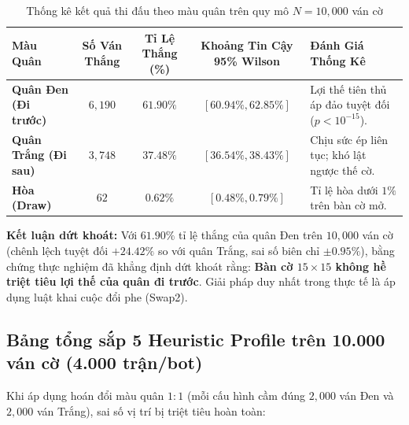 \documentclass[11pt,a4paper]{article}
\begin{document}
\begin{table}[htbp]
\centering
\small
\caption{Thống kê kết quả thi đấu theo màu quân trên quy mô $N = 10{,}000$ ván cờ}
\label{tab:color_stats_10k}
\begin{tabularx}{\textwidth}{l c c c X}
\toprule
\textbf{Màu Quân} & \textbf{Số Ván Thắng} & \textbf{Tỉ Lệ Thắng (\%)} & \textbf{Khoảng Tin Cậy 95\% Wilson} & \textbf{Đánh Giá Thống Kê} \\
\midrule
\textbf{Quân Đen (Đi trước)}  & \textbf{$6{,}190$} & \textbf{$61.90\%$} & $[60.94\%, 62.85\%]$ & Lợi thế tiên thủ áp đảo tuyệt đối ($p < 10^{-15}$). \\
\textbf{Quân Trắng (Đi sau)} & $3{,}748$ & $37.48\%$ & $[36.54\%, 38.43\%]$ & Chịu sức ép liên tục; khó lật ngược thế cờ. \\
\textbf{Hòa (Draw)}           & $62$   & $0.62\%$  & $[0.48\%, 0.79\%]$   & Tỉ lệ hòa dưới $1\%$ trên bàn cờ mở. \\
\bottomrule
\end{tabularx}
\end{table}

\textbf{Kết luận dứt khoát:} Với $61.90\%$ tỉ lệ thắng của quân Đen trên $10{,}000$ ván cờ (chênh lệch tuyệt đối \textbf{$+24.42\%$} so với quân Trắng, sai số biên chỉ $\pm 0.95\%$), bằng chứng thực nghiệm đã khẳng định dứt khoát rằng: \textbf{Bàn cờ $15 \times 15$ không hề triệt tiêu lợi thế của quân đi trước}. Giải pháp duy nhất trong thực tế là áp dụng luật khai cuộc đổi phe (Swap2).

\subsection{Bảng tổng sắp 5 Heuristic Profile trên 10.000 ván cờ (4.000 trận/bot)}
Khi áp dụng hoán đổi màu quân $1:1$ (mỗi cấu hình cầm đúng $2{,}000$ ván Đen và $2{,}000$ ván Trắng), sai số vị trí bị triệt tiêu hoàn toàn:
\end{document}
